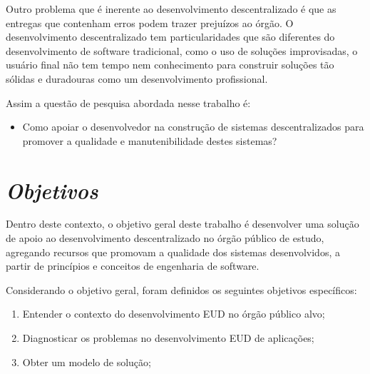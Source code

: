 Outro problema que é inerente ao desenvolvimento descentralizado é que as entregas que contenham erros podem trazer prejuízos ao órgão. O desenvolvimento descentralizado tem particularidades que são diferentes do desenvolvimento de software tradicional, como o uso de soluções improvisadas, o usuário final não tem tempo nem conhecimento para construir soluções tão sólidas e duradouras como um desenvolvimento profissional.

Assim a questão de pesquisa abordada nesse trabalho é:
\begin{itemize}
\item Como apoiar o desenvolvedor na construção de sistemas descentralizados para promover a qualidade e manutenibilidade destes sistemas?
\end{itemize}

\section{\textit{Objetivos}}

Dentro deste contexto, o objetivo geral deste trabalho é desenvolver uma solução de apoio ao desenvolvimento descentralizado no órgão público de estudo, agregando recursos que promovam a qualidade dos sistemas desenvolvidos, a partir de princípios e conceitos de engenharia de software.

Considerando o objetivo geral, foram definidos os seguintes objetivos específicos:

\begin{enumerate}
	\item Entender o contexto do desenvolvimento EUD no órgão público alvo;
	\item Diagnosticar os problemas no desenvolvimento EUD de aplicações;
    \item Obter um modelo de solução;
\end{enumerate}


